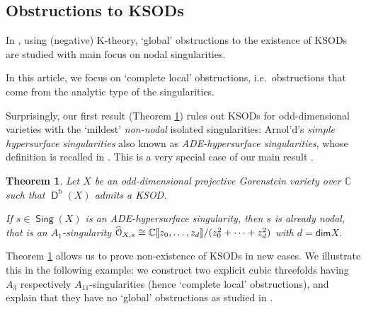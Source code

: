 \documentclass[reqno, 12pt, a4paper, twosided, english]{amsart}
\theoremstyle{plain}
\newtheorem{thm}{Theorem}[section]
\theoremstyle{definition}
\theoremstyle{remark}
\newtheorem*{Key Statement}{Key Statement}
\DeclareMathOperator{\Sing}{\mathsf{Sing}}
\renewcommand{\dim}{\mathsf{dim}}
\newcommand{\opname}[1]{\operatorname{\mathsf{#1}}}
\newcommand{\co}{{\mathcal O}}
\newcommand{\C}{\mathbb{C}}
\newcommand{\KSOD}{KSOD\xspace}
\newcommand{\KSODs}{KSODs\xspace}
\newcommand{\Db}{\opname{D}^{\mathrm{b}}}
\begin{document}
\subsection{Obstructions to \KSODs}
In \cite{KPS19}, using (negative) K-theory, `global' obstructions to the existence of \KSODs are studied with main focus on nodal singularities.

In this article, we focus on `complete local' obstructions, i.e.\ obstructions that come from the analytic type of the singularities.
%
%

Surprisingly, our first result (Theorem \ref{T:GoalNEW}) rules out \KSODs for odd-dimensional varieties with the `mildest' \emph{non-nodal} isolated singularities: 
Arnol'd's \emph{simple hypersurface singularities} also known as \emph{ADE-hypersurface singularities}, whose definition is recalled in . This is a very special case of our main result .%

%

\begin{thm}\label{T:GoalNEW}
  Let $X$ be an odd-dimensional projective Gorenstein variety over $\C$ such that $\Db(X)$ admits a \KSOD.\nopagebreak

  If $s \in \Sing(X)$ is an ADE-hypersurface singularity,
  then $s$ is already nodal, that is an $A_1$-singularity $\smash{\widehat{\co}_{X,s}} \cong \C\llbracket z_0, \ldots, z_{d}\rrbracket/(z_0^2 + \cdots + z_{d}^2 )$ with $d = \dim X$.
  \end{thm}

  
Theorem \ref{T:GoalNEW} 
allows us to prove non-existence of \KSODs in new cases.
We illustrate this in the following example: we 
construct two explicit cubic threefolds having $A_3$ respectively $A_{11}$-singularities (hence `complete local' obstructions), and explain that they have no `global' obstructions as studied in \cite{KPS19}.
%
%
%
%
%
%

%

%
\end{document}
